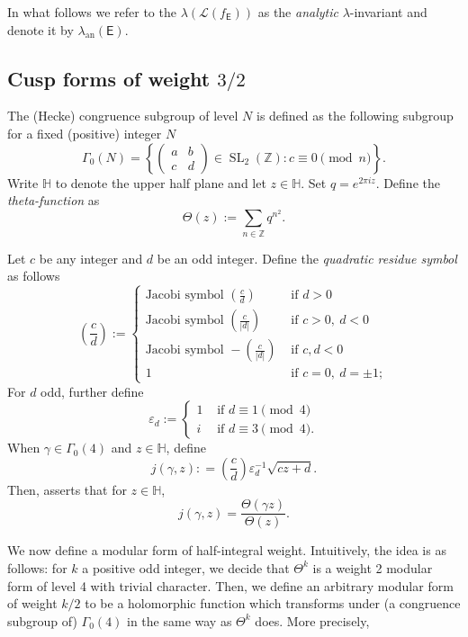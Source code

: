 \documentclass{amsart}
\numberwithin{equation}{section}
\theoremstyle{remark}
\newcommand{\SL}{\operatorname{SL}}
\newcommand{\an}{\operatorname{an}}
\newcommand{\Z}{\mathbb{Z}}
\newcommand{\EC}{\mathsf{E}}
\theoremstyle{plain} %
\begin{document}
In what follows we refer to the $\lambda(\mathcal{L}(f_\EC))$ as the \emph{analytic} $\lambda$-invariant and denote it by $\lambda_{\an}(\EC)$.

\subsection{Cusp forms of weight \texorpdfstring{$3/2$}{}}
The (Hecke) congruence subgroup of level $N$ is defined as the following subgroup for a fixed (positive) integer $N$
\[
\Gamma_0(N) = \left\{ \begin{pmatrix} a & b \\ c & d\end{pmatrix} \in \SL_2(\Z) \colon c \equiv 0 \pmod{n}\right\}.
\]
Write $\mathbb{H}$ to denote the upper half plane and let $z\in \mathbb{H}$.
Set $q = e^{2\pi i z}$.
Define the \emph{theta-function} as
\[
\Theta(z):=\sum_{n\in \Z}q^{n^2}.
\]

Let $c$ be any integer and $d$ be an odd integer.
Define the \emph{quadratic residue symbol} as follows
\[
\left(\frac{c}{d}\right) := \begin{cases}
    \text{Jacobi symbol } \left(\frac{c}{d}\right) & \text{ if } d >0\\
    \text{Jacobi symbol } \left(\frac{c}{|d|}\right) & \text{ if } c>0, \ d <0\\
    \text{Jacobi symbol } - \left(\frac{c}{|d|}\right) & \text{ if } c,d <0\\
    1 & \text{ if } c=0, \ d=\pm 1;
\end{cases}
\]
For $d$ odd, further define
\[
\varepsilon_d := \begin{cases}
    1 & \text{ if } d\equiv 1\pmod{4}\\
    i & \text{ if } d\equiv 3\pmod{4}.
\end{cases}
\]
When $\gamma\in \Gamma_0(4)$ and $z\in \mathbb{H}$, define %
\[
j(\gamma,z) : =\left(\frac{c}{d}\right)\varepsilon_d^{-1}\sqrt{cz+d}.
\]
Then, \cite[Theorem on p.~148]{koblitz} asserts that for $z\in \mathbb{H}$,
\[
j(\gamma,z)=\frac{\Theta(\gamma z)}{\Theta(z)}.
\]

We now define a modular form of half-integral weight.
Intuitively, the idea is as follows: for $k$ a positive odd integer, we decide that $\Theta^k$ is a weight 2 modular form of level 4 with trivial character.
Then, we define an arbitrary modular form of weight $k/2$ to be a holomorphic function which transforms under (a congruence subgroup of) $\Gamma_0(4)$ in the same way as $\Theta^k$ does.
More precisely,
\end{document}
